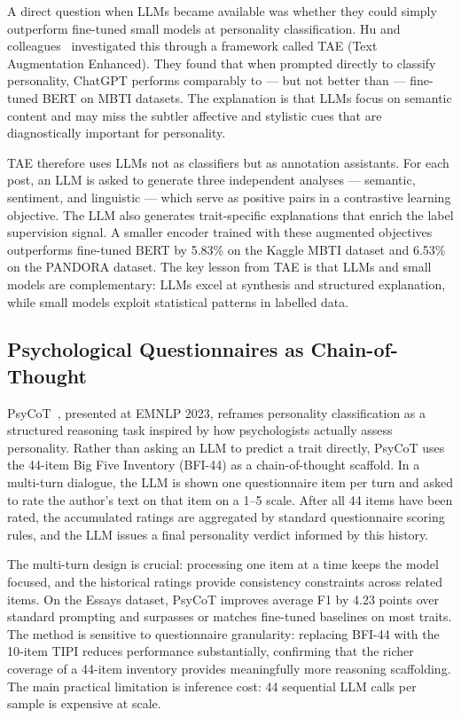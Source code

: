 \documentclass[../main.tex]{subfiles}
\begin{document}
A direct question when LLMs became available was whether they could simply outperform fine-tuned small models at personality classification. Hu and colleagues~\cite{hu2024llm} investigated this through a framework called TAE (Text Augmentation Enhanced). They found that when prompted directly to classify personality, ChatGPT performs comparably to --- but not better than --- fine-tuned BERT on MBTI datasets. The explanation is that LLMs focus on semantic content and may miss the subtler affective and stylistic cues that are diagnostically important for personality.

TAE therefore uses LLMs not as classifiers but as annotation assistants. For each post, an LLM is asked to generate three independent analyses --- semantic, sentiment, and linguistic --- which serve as positive pairs in a contrastive learning objective. The LLM also generates trait-specific explanations that enrich the label supervision signal. A smaller encoder trained with these augmented objectives outperforms fine-tuned BERT by 5.83\% on the Kaggle MBTI dataset and 6.53\% on the PANDORA dataset. The key lesson from TAE is that LLMs and small models are complementary: LLMs excel at synthesis and structured explanation, while small models exploit statistical patterns in labelled data.

\subsection{Psychological Questionnaires as Chain-of-Thought}

PsyCoT~\cite{yang2023psycot}, presented at EMNLP 2023, reframes personality classification as a structured reasoning task inspired by how psychologists actually assess personality. Rather than asking an LLM to predict a trait directly, PsyCoT uses the 44-item Big Five Inventory (BFI-44) as a chain-of-thought scaffold. In a multi-turn dialogue, the LLM is shown one questionnaire item per turn and asked to rate the author's text on that item on a 1--5 scale. After all 44 items have been rated, the accumulated ratings are aggregated by standard questionnaire scoring rules, and the LLM issues a final personality verdict informed by this history.

The multi-turn design is crucial: processing one item at a time keeps the model focused, and the historical ratings provide consistency constraints across related items. On the Essays dataset, PsyCoT improves average F1 by 4.23 points over standard prompting and surpasses or matches fine-tuned baselines on most traits. The method is sensitive to questionnaire granularity: replacing BFI-44 with the 10-item TIPI reduces performance substantially, confirming that the richer coverage of a 44-item inventory provides meaningfully more reasoning scaffolding. The main practical limitation is inference cost: 44 sequential LLM calls per sample is expensive at scale.
\end{document}
